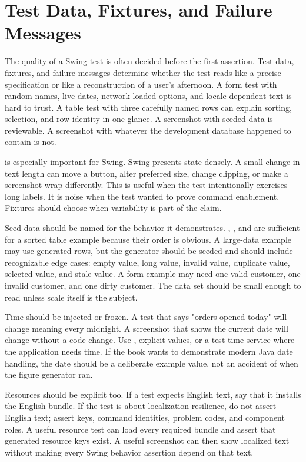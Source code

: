 \section{Test Data, Fixtures, and Failure Messages}

The quality of a Swing test is often decided before the first assertion. Test data, fixtures, and failure messages determine whether the test reads like a precise specification or like a reconstruction of a user's afternoon. A form test with random names, live dates, network-loaded options, and locale-dependent text is hard to trust. A table test with three carefully named rows can explain sorting, selection, and row identity in one glance. A screenshot with seeded data is reviewable. A screenshot with whatever the development database happened to contain is not.

 is especially important for Swing. Swing presents state densely. A small change in text length can move a button, alter preferred size, change clipping, or make a screenshot wrap differently. This is useful when the test intentionally exercises long labels. It is noise when the test wanted to prove command enablement. Fixtures should choose when variability is part of the claim.

Seed data should be named for the behavior it demonstrates. , , and  are sufficient for a sorted table example because their order is obvious. A large-data example may use generated rows, but the generator should be seeded and should include recognizable edge cases: empty value, long value, invalid value, duplicate value, selected value, and stale value. A form example may need one valid customer, one invalid customer, and one dirty customer. The data set should be small enough to read unless scale itself is the subject.

Time should be injected or frozen. A test that says "orders opened today" will change meaning every midnight. A screenshot that shows the current date will change without a code change. Use , explicit  values, or a test time service where the application needs time. If the book wants to demonstrate modern Java date handling, the date should be a deliberate example value, not an accident of when the figure generator ran.

Resources should be explicit too. If a test expects English text, say that it installs the English bundle. If the test is about localization resilience, do not assert English text; assert keys, command identities, problem codes, and component roles. A useful resource test can load every required bundle and assert that generated resource keys exist. A useful screenshot can then show localized text without making every Swing behavior assertion depend on that text.

